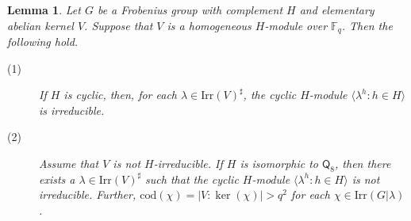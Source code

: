 \documentclass[9pt]{article}
\newtheorem{lem}{\bf Lemma}[section]
\begin{document}
\begin{lem}\label{lem: homogeneous mod and cod}
	Let $G$ be a Frobenius group with complement $H$ and elementary abelian kernel $V$.
	Suppose that $V$ is a homogeneous $H$-module over $\mathbb{F}_q$.  
	Then the following hold.
	\begin{description}
		\item[(1)] If $H$ is cyclic, then, for each $\lambda\in \mathrm{Irr}(V)^\sharp$, the cyclic $H$-module $\langle \lambda^{h}:h\in H\rangle$ is irreducible. 
		\item[(2)] Assume that $V$ is not $H$-irreducible.
		If $H$ is isomorphic to $\mathsf{Q}_8$, then there exists a $\lambda\in \mathrm{Irr}(V)^\sharp$
		such that the cyclic $H$-module $\langle \lambda^{h}:h\in H\rangle$ is not irreducible.
		Further, $\mathrm{cod}(\chi)=|V:\ker(\chi)|>q^{2}$ for each $\chi \in \mathrm{Irr}(G|\lambda)$.
	\end{description}
\end{lem}
\end{document}
